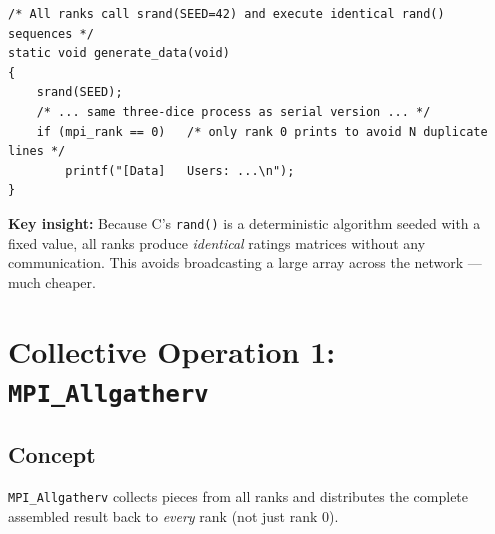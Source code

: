 \documentclass[12pt,a4paper]{article}
\begin{document}
\begin{lstlisting}
/* All ranks call srand(SEED=42) and execute identical rand() sequences */
static void generate_data(void)
{
    srand(SEED);
    /* ... same three-dice process as serial version ... */
    if (mpi_rank == 0)   /* only rank 0 prints to avoid N duplicate lines */
        printf("[Data]   Users: ...\n");
}
\end{lstlisting}

\textbf{Key insight:}  Because C's \texttt{rand()} is a deterministic
algorithm seeded with a fixed value, all ranks produce \emph{identical}
ratings matrices without any communication.  This avoids broadcasting a
large array across the network — much cheaper.

\section{Collective Operation 1: \texttt{MPI\_Allgatherv}}

\subsection{Concept}

\texttt{MPI\_Allgatherv} collects pieces from all ranks and distributes the
complete assembled result back to \emph{every} rank (not just rank 0).

\begin{center}
\end{center}
\end{document}
